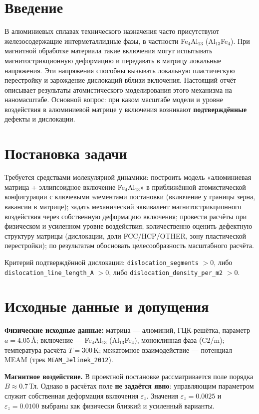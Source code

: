 \documentclass[14pt,a4paper]{extarticle}
\newcommand{\code}[1]{\texttt{#1}}
\begin{document}
\section{Введение}
В алюминиевых сплавах технического назначения часто присутствуют железосодержащие интерметаллидные фазы, в частности Fe$_4$Al$_{13}$ (Al$_{13}$Fe$_4$). При магнитной обработке материала такие включения могут испытывать магнитострикционную деформацию и передавать в матрицу локальные напряжения. Эти напряжения способны вызывать локальную пластическую перестройку и зарождение дислокаций вблизи включения. Настоящий отчёт описывает результаты атомистического моделирования этого механизма на наномасштабе. Основной вопрос: при каком масштабе модели и уровне воздействия в алюминиевой матрице у включения возникают \textbf{подтверждённые} дефекты и дислокации.

\section{Постановка задачи}
Требуется средствами молекулярной динамики: построить модель «алюминиевая матрица + эллипсоидное включение Fe$_4$Al$_{13}$» в приближённой атомистической конфигурации с ключевыми элементами постановки (включение у границы зерна, вакансии в матрице); задать механический эквивалент магнитострикционного воздействия через собственную деформацию включения; провести расчёты при физическом и усиленном уровне воздействия; количественно оценить дефектную структуру матрицы (дислокации, доли FCC/HCP/OTHER, зону пластической перестройки); по результатам обосновать целесообразность масштабного расчёта.

Критерий подтверждённой дислокации: \code{dislocation\_segments} $> 0$, либо \code{dislocation\_line\_length\_A} $> 0$, либо \code{dislocation\_density\_per\_m2} $> 0$.

\section{Исходные данные и допущения}
\textbf{Физические исходные данные:} матрица — алюминий, ГЦК-решётка, параметр $a = 4.05$\,\AA; включение — Fe$_4$Al$_{13}$ (Al$_{13}$Fe$_4$), моноклинная фаза (C2/m); температура расчёта $T = 300$\,K; межатомное взаимодействие — потенциал MEAM (трек \code{MEAM\_Jelinek\_2012}).

\textbf{Магнитное воздействие.} В проектной постановке рассматривается поле порядка $B \approx 0.7$\,Тл. Однако в расчётах поле \textbf{не задаётся явно}: управляющим параметром служит собственная деформация включения $\varepsilon_z$. Значения $\varepsilon_z = 0.0025$ и $\varepsilon_z = 0.0100$ выбраны как физически близкий и усиленный варианты.
\end{document}
